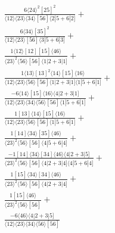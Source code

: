 \documentclass[varwidth, border=5pt]{standalone}
\begin{document}
\begin{my}
$\begin{gathered}
\scriptscriptstyle\frac{6⟨24⟩^2[25]^2}{⟨12⟩⟨23⟩⟨34⟩[56]⟨2|5+6|2]}+\\
\scriptscriptstyle\frac{6⟨34⟩[35]^2}{⟨12⟩⟨23⟩[56]⟨3|5+6|3]}+\\
\scriptscriptstyle\frac{1⟨12⟩[12][15]⟨46⟩}{⟨23⟩^2⟨56⟩[56]⟨1|2+3|1]}+\\
\scriptscriptstyle\frac{1⟨13⟩[13]^2⟨14⟩[15]⟨16⟩}{⟨12⟩⟨23⟩⟨56⟩[56]⟨1|2+3|1]⟨1|5+6|1]}+\\
\scriptscriptstyle\frac{-6⟨14⟩[15]⟨16⟩⟨4|2+3|1]}{⟨12⟩⟨23⟩⟨34⟩⟨56⟩[56]⟨1|5+6|1]}+\\
\scriptscriptstyle\frac{1[13]⟨14⟩[15]⟨16⟩}{⟨12⟩⟨23⟩⟨56⟩[56]⟨1|5+6|1]}+\\
\scriptscriptstyle\frac{1[14]⟨34⟩[35]⟨46⟩}{⟨23⟩^2⟨56⟩[56]⟨4|5+6|4]}+\\
\scriptscriptstyle\frac{-1[14]⟨34⟩[34]⟨46⟩⟨4|2+3|5]}{⟨23⟩^2⟨56⟩[56]⟨4|2+3|4]⟨4|5+6|4]}+\\
\scriptscriptstyle\frac{1[15]⟨34⟩[34]⟨46⟩}{⟨23⟩^2⟨56⟩[56]⟨4|2+3|4]}+\\
\scriptscriptstyle\frac{1[15]⟨46⟩}{⟨23⟩^2⟨56⟩[56]}+\\
\scriptscriptstyle\frac{-6⟨46⟩⟨4|2+3|5]}{⟨12⟩⟨23⟩⟨34⟩⟨56⟩[56]}\phantom{+}
\end{gathered}$
\end{my}
\end{document}
